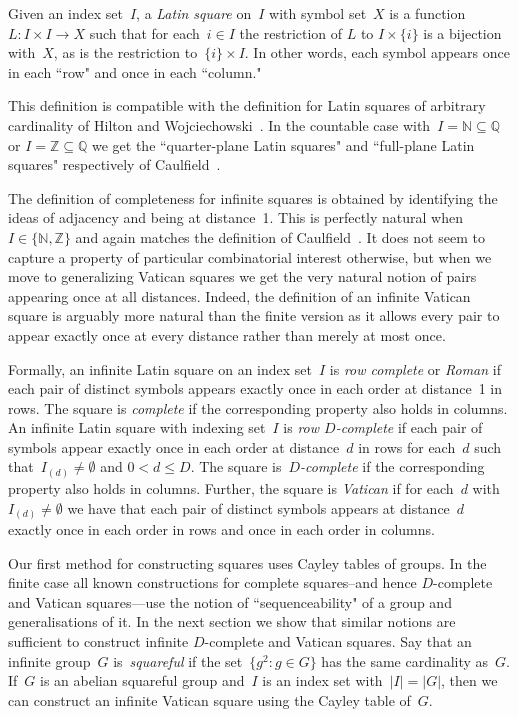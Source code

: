 \documentclass[12pt,a4paper]{article}
\newcommand{\Z}{\mathbb{Z}}
\newcommand{\N}{\mathbb{N}}
\newcommand{\Q}{\mathbb{Q}}
\begin{document}
Given an index set~$I$, a {\em Latin square} on~$I$ with symbol set~$X$ is a function $L: I \times I \rightarrow X$ such that for each~$i \in I$ the restriction of $L$ to $I \times \{i\}$ is a bijection with~$X$, as is the restriction to~$\{i\} \times I$.   In other words, each symbol appears once in each ``row" and once in each ``column."  

This definition is  compatible with the definition for Latin squares of arbitrary cardinality of Hilton and Wojciechowski~\cite{HW05}.  In the countable case with~$I = \N \subseteq \Q$ or $I = \Z \subseteq \Q$ we get the ``quarter-plane Latin squares" and ``full-plane Latin squares" respectively of Caulfield~\cite{Caulfield96}.




The definition of completeness for infinite squares is obtained by identifying the ideas of adjacency and being at distance~1.  This is perfectly natural when~$I \in \{ \N ,\Z\}$ and again matches the definition of Caulfield~\cite{Caulfield96}.   It does not seem to capture a property of particular combinatorial interest otherwise, but when we move to generalizing Vatican squares we get the very natural notion of pairs appearing once at all distances.  Indeed, the definition of an infinite Vatican square is arguably more natural than the finite version as it allows every pair to appear exactly once at every distance rather than merely at most once.

Formally, an infinite Latin square on an index set~$I$  is {\em row complete} or {\em Roman} if each pair of distinct symbols appears exactly once in each order at distance~1 in rows.  The square is {\em complete} if the corresponding property also holds in columns.   An infinite Latin square with indexing set~$I$ is {\em row $D$-complete} if each pair of symbols appear exactly once in each order at distance~$d$ in rows for each~$d$ such that~$I_{(d)} \neq \emptyset$ and $0 < d \leq D$. The square is~{\em $D$-complete} if the corresponding property also holds in columns. Further, the square is {\em Vatican} if for each~$d$ with~$I_{(d)} \neq \emptyset$ we have that each pair of distinct symbols appears at distance~$d$ exactly once in each order in rows and once in each order in columns.



Our first method for constructing squares uses Cayley tables of groups.   In the finite case all known constructions for complete squares--and hence $D$-complete and Vatican squares---use the notion of ``sequenceability" of a group and generalisations of it.  In the next section we show that similar notions are sufficient to construct infinite $D$-complete and Vatican  squares.  Say that an infinite group~$G$ is~{\em squareful} if the set~$\{ g^2 : g \in G\}$ has the same cardinality as~$G$.  If~$G$ is an abelian squareful group and~$I$ is an index set with~$|I| = |G|$, then we can construct an infinite Vatican square using the Cayley table of~$G$. 
\end{document}
